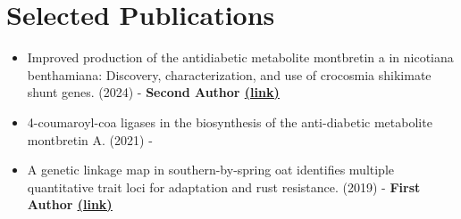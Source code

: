 \documentclass[letterpaper,11pt]{article}
\makeatletter
\newcommand{\customfullcite}[2][]{%
    \begingroup
    \@ifundefined{custommaxnames}{%
        \def\custommaxnames{1}%
    }{}%
    \ifblank{#1}{}{%
        \def\custommaxnames{#1}%
    }%
    \def\abx@field@labelnumber{\custommaxnames}%
    \fullcite{#2}%
    \endgroup
}
\makeatother
\begin{document}
\section*{Selected Publications}
\begin{itemize}[leftmargin=0.15in, label={}]
    \item{Improved production of the antidiabetic metabolite montbretin a in nicotiana
    benthamiana: Discovery, characterization, and use of crocosmia shikimate shunt genes. (2024) - {\textbf {Second Author {\href{https://onlinelibrary.wiley.com/doi/full/10.1111/tpj.16528}{\underline{(link)}}}}}}
    \item{4-coumaroyl-coa ligases in the biosynthesis of the anti-diabetic metabolite montbretin A. (2021) - }
    \item{A genetic linkage map in southern-by-spring oat identifies multiple quantitative trait loci for adaptation and rust
    resistance. (2019) - {\textbf {First Author {\href{https://onlinelibrary.wiley.com/doi/abs/10.1111/pbr.12666}{\underline{(link)}}}}}}
\end{itemize}
\end{document}
